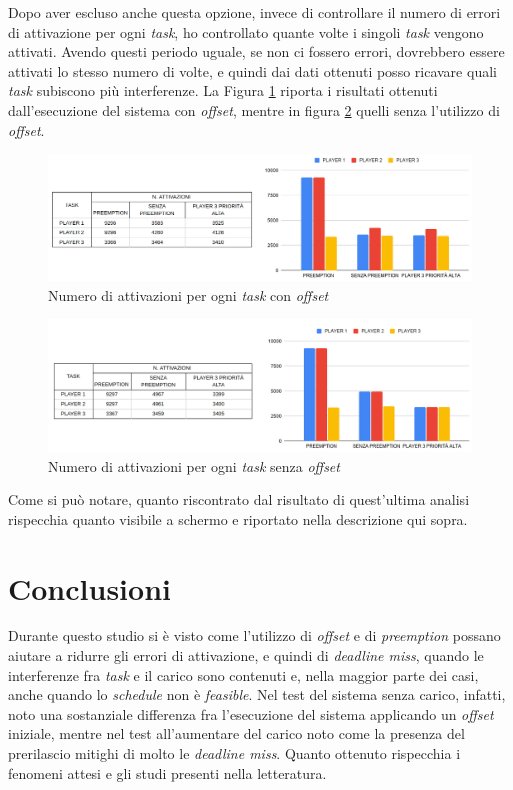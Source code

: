 \documentclass{article}
\begin{document}
Dopo aver escluso anche questa opzione, invece di controllare il numero di errori di attivazione per ogni \textit{task}, ho controllato quante volte i singoli \textit{task} vengono attivati. Avendo questi periodo uguale, se non ci fossero errori, dovrebbero essere attivati lo stesso numero di volte, e quindi dai dati ottenuti posso ricavare quali \textit{task} subiscono più interferenze. La Figura \ref{attivazioni-offset} riporta i risultati ottenuti dall'esecuzione del sistema con \textit{offset}, mentre in figura \ref{attivazioni-autostart} quelli senza l'utilizzo di \textit{offset}.

\begin{figure}[H]
	\centering
	\includegraphics[width=6in]{image/attivazioni-offset.png}
	\caption{Numero di attivazioni per ogni \textit{task} con \textit{offset}}
	\label{attivazioni-offset}
\end{figure}
\begin{figure}[H]
	\centering
	\includegraphics[width=6in]{image/attivazioni-autostart.png}
	\caption{Numero di attivazioni per ogni \textit{task} senza \textit{offset}}
	\label{attivazioni-autostart}
\end{figure}

Come si può notare, quanto riscontrato dal risultato di quest'ultima analisi rispecchia quanto visibile a schermo e riportato nella descrizione qui sopra. 

\section{Conclusioni}
Durante questo studio si è visto come l'utilizzo di \textit{offset} e di \textit{preemption} possano aiutare a ridurre gli errori di attivazione, e quindi di \textit{deadline miss}, quando le interferenze fra \textit{task} e il carico sono contenuti e, nella maggior parte dei casi, anche quando lo \textit{schedule} non è \textit{feasible}. Nel test del sistema senza carico, infatti, noto una sostanziale differenza fra l'esecuzione del sistema applicando un \textit{offset} iniziale, mentre nel test all'aumentare del carico noto come la presenza del prerilascio mitighi di molto le \textit{deadline miss}. Quanto ottenuto rispecchia i fenomeni attesi e gli studi presenti nella letteratura.
\end{document}
